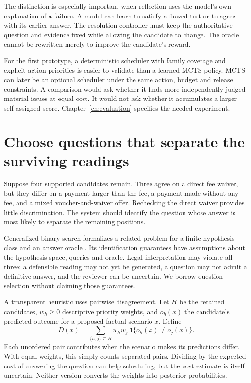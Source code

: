 \documentclass[12pt,a4paper,oneside,openany]{book}
\begin{document}
The distinction is especially important when reflection uses the model's own
explanation of a failure. A model can learn to satisfy a flawed test or to agree
with its earlier answer. The resolution controller must keep the authoritative
question and evidence fixed while allowing the candidate to change. The oracle
cannot be rewritten merely to improve the candidate's reward.

For the first prototype, a deterministic scheduler with family coverage and
explicit action priorities is easier to validate than a learned MCTS policy.
MCTS can later be an optional scheduler under the same action, budget and release
constraints. A comparison would ask whether it finds more independently judged
material issues at equal cost. It would not ask whether it accumulates a larger
self-assigned score. Chapter~\ref{ch:evaluation} specifies the needed experiment.

\section{Choose questions that separate the surviving readings}
\label{merge:M05:08}


Suppose four supported candidates remain. Three agree on a direct fee waiver,
but they differ on a payment larger than the fee, a payment made without any fee,
and a mixed voucher-and-waiver offer. Rechecking the direct waiver provides
little discrimination. The system should identify the question whose answer is
most likely to separate the remaining positions.

Generalized binary search formalizes a related problem for a finite hypothesis
class and an answer oracle \citep[Figure 1 and sections I--II]{gbs2011}. Its
identification guarantees have assumptions about the hypothesis space, queries
and oracle. Legal interpretation may violate all three: a defensible reading may
not yet be generated, a question may not admit a definitive answer, and the
reviewer can be uncertain. We borrow question selection without claiming those
guarantees.

A transparent heuristic uses pairwise disagreement. Let $H$ be the retained
candidates, $w_h\geq0$ descriptive priority weights, and $o_h(x)$ the candidate's
predicted outcome for a proposed factual scenario $x$. Define
\begin{equation}
 D(x)=\sum_{\{h,j\}\subseteq H}w_h w_j\,
       \mathbf{1}\{o_h(x)\ne o_j(x)\}.
 \label{eq:disagreement-question}
\end{equation}
Each unordered pair contributes when the scenario makes its predictions differ.
With equal weights, this simply counts separated pairs. Dividing by the expected
cost of answering the question can help scheduling, but the cost estimate is
itself uncertain. Neither version converts the weights into posterior
probabilities.
\end{document}
